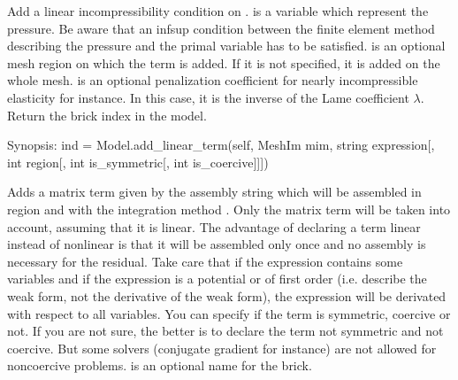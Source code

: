 \documentclass[a4paper,11pt,english]{sphinxmanual}
\begin{document}
\begin{fulllineitems}
\begin{fulllineitems}
Add a linear incompressibility condition on . 
is a variable which represent the pressure. Be aware that an inf\sphinxhyphen{}sup
condition between the finite element method describing the pressure and the
primal variable has to be satisfied.  is an optional mesh region on
which the term is added. If it is not specified, it is added on the whole
mesh.  is an optional penalization coefficient for nearly
incompressible elasticity for instance. In this case, it is the inverse
of the Lame coefficient \(\lambda\). Return the brick index in the
model.

\end{fulllineitems}


\begin{fulllineitems}
\label{\detokenize{python/cmdref_Model:getfem.Model.add_linear_term}}
Synopsis: ind = Model.add\_linear\_term(self, MeshIm mim, string expression{[}, int region{[}, int is\_symmetric{[}, int is\_coercive{]}{]}{]})

Adds a matrix term given by the assembly string  which will
be assembled in region  and with the integration method .
Only the matrix term will be taken into account, assuming that it is
linear.
The advantage of declaring a term linear instead of nonlinear is that
it will be assembled only once and no assembly is necessary for the
residual.
Take care that if the expression contains some variables and if the
expression is a potential or of first order (i.e. describe the weak
form, not the derivative of the weak form), the expression will be
derivated with respect to all variables.
You can specify if the term is symmetric, coercive or not.
If you are not sure, the better is to declare the term not symmetric
and not coercive. But some solvers (conjugate gradient for instance)
are not allowed for non\sphinxhyphen{}coercive problems.
 is an optional name for the brick.

\end{fulllineitems}


\end{fulllineitems}
\end{document}
